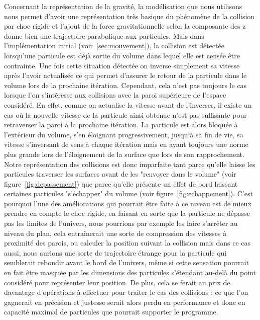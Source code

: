 Concernant la représentation de la gravité, la modélisation que nous utilisons nous permet d'avoir une représentation très basique du phénomène de la collision par choc rigide et l'ajout de la force gravitationnelle selon la composante des z donne bien une trajectoire parabolique aux particules.
Mais dans l'implémentation initial (voir~\ref{sec:mouvement}), la collision est détectée lorsqu'une particule est déjà sortie du volume dans lequel elle est censée être contrainte.
Une fois cette situation détectée on inverse simplement sa vitesse après l'avoir actualisée ce qui permet d'assurer le retour de la particule dans le volume lors de la prochaine itération.
Cependant, cela n'est pas toujours le cas lorsque l'on s'intéresse aux collisions avec la paroi supérieure de l'espace considéré.
En effet, comme on actualise la vitesse avant de l'inverser, il existe un cas où la nouvelle vitesse de la particule ainsi obtenue n'est pas suffisante pour retraverser la paroi à la prochaine itération.
La particule est alors bloquée à l'extérieur du volume, s'en éloignant progressivement, jusqu'à sa fin de vie, sa vitesse s'inversant de sens à chaque itération mais en ayant toujours une norme plus grande lors de l'éloignement de la surface que lors de son rapprochement.
Notre représentation des collisions est donc imparfaite tant parce qu'elle laisse les particules traverser les surfaces avant de les "renvoyer dans le volume" (voir figure~\ref{fig:depassement}) que parce qu'elle présente un effet de bord laissant certaines particules "s'échapper" du volume (voir figure~\ref{fig:echappement}).
C'est pourquoi l'une des améliorations qui pourrait être faite à ce niveau est de mieux prendre en compte le choc rigide, en faisant en sorte que la particule ne dépasse pas les limites de l'univers, nous pourrions par exemple les faire s'arrêter au niveau du plan, cela entraînerait une sorte de compression des vitesses à proximité des parois, ou calculer la position suivant la collision mais dans ce cas aussi, nous aurions une sorte de trajectoire étrange pour la particule qui semblerait rebondir avant le bord de l'univers, même si cette sensation pourrait en fait être masquée par les dimensions des particules s'étendant au-delà du point considéré pour représenter leur position.
De plus, cela se ferait au prix de davantage d'opérations à effectuer pour traiter le cas des collisions : ce que l'on gagnerait en précision et justesse serait alors perdu en performance et donc en capacité maximal de particules que pourrait supporter le programme.

